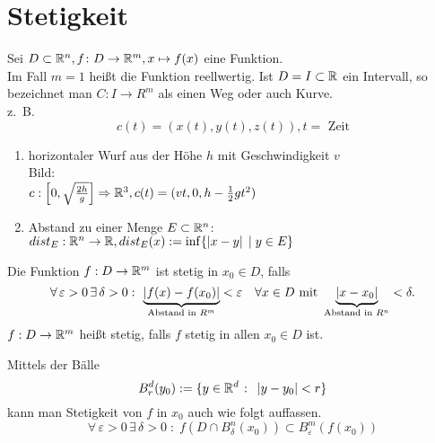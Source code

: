 \documentclass[../ana1.tex]{subfiles}
\begin{document}
\setcounter{section}{14}
\section{Stetigkeit}
Sei \( D \subset \mathbb{R}^n, f \colon D \rightarrow \mathbb{R}^m, 
x \mapsto f(x) \) eine Funktion.\\
Im Fall \( m=1 \) heißt die Funktion reellwertig. 
Ist \( D = I \subset \mathbb{R} \) ein Intervall, so bezeichnet 
man \( C: I\rightarrow R^m \) als einen Weg oder auch Kurve.\\
z.\ B.\ 
\[ c(t) = (x(t), y(t), z(t)), t=\text{ Zeit} \]

\begin{bspe}\leavevmode
    \begin{enumerate}
        \item horizontaler Wurf aus der Höhe \( h \) mit 
        Geschwindigkeit \(v\) \\
        Bild:\\
        \( c: \left[0, \sqrt{\frac{2 h}{g}} \right] \Rightarrow 
        \mathbb{R}^3, c(t) = (vt, 0, h - \frac{1}{2} g t^2) \)
        \item Abstand zu einer Menge \( E \subset \mathbb{R}^n \):\\
        \( dist_E : \mathbb{R}^n \rightarrow \mathbb{R}, dist_E(x) 
        := \inf \{ \left|x-y\right| \;\vert \; y\in E \} \)
    \end{enumerate}
\end{bspe}
\begin{defi}[Stetigkeit]
    Die Funktion \( f: D\rightarrow \mathbb{R}^m \) ist stetig 
    in \( x_0 \in D \), falls
    \[ \forall \, \varepsilon > 0 \,\exists \, \delta > 0 
    \, \colon \, \underbrace{ \left| f(x) - f(x_0) 
    \right|}_{\text{Abstand in }R^m} < \varepsilon \quad 
    \forall x\in D \text{ mit } \underbrace{\left|x - x_0\right| 
    }_{\text{Abstand in } R^n} < \delta. \]
    \( f: D\rightarrow \mathbb{R}^m \) heißt stetig, falls \( f \) 
    stetig in allen \(x_0 \in D \) ist.
\end{defi}
\begin{bem}
    Mittels der Bälle 
    \[ B_r^d(y_0) := \{ y\in\mathbb{R}^d \;\colon \; 
    \left|y-y_0\right|<r \} \]
    kann man Stetigkeit von \( f \) in \( x_0 \) auch wie folgt
    auffassen.
    \[ \forall \, \varepsilon > 0 \,\exists \, \delta > 0 
    \;\colon \; f(D\cap B_\delta^n(x_0)) \subset 
    B_\varepsilon^m (f(x_0)) \]
\end{bem}
\end{document}
